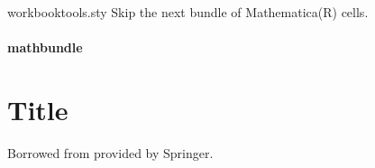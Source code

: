 \documentclass{article}
\begin{document}
\begin{package}{workbooktools.sty}
Skip the next bundle of Mathematica(R) cells.

\begin{source}[\skipMathBundle]
\newcommand\skipMathBundle{\stepcounter{mathbundle}}
\end{source}

\paragraph{mathbundle}

\begin{source}[mathbundle]
\newenvironment{mathbundle}{%
  \begin{list}{}{
    \parskip=6pt plus 4pt
    \topsep=6pt plus 4pt
    \partopsep=0pt plus 4pt
    \itemsep=6pt plus 4pt
    \parsep=0pt plus 4pt
  }%
  \raggedleft}{%
  \end{list}}
\end{source}

\begin{source}[\includemathcell]
\newcommand\includemathcell[1]{%
  \item\relax\texttt{[image: \#1]}}
\end{source}

\begin{source}[\mathcellscale]
\newcommand\mathcellscale{0.72}
\end{source}

\section{Title}

Borrowed from  provided by Springer.

\begin{source}[\maketitle]
\def\maketitle{\par
 \begingroup
   \def\thefootnote{\fnsymbol{footnote}}%
   \def\@makefnmark{\hbox
       to\z@{$\m@th^{\@thefnmark}$\hss}}%
   \if@twocolumn
     \twocolumn[\@maketitle]%
     \else \newpage
     \global\@topnum\z@   %
     \@maketitle \fi\thispagestyle{empty}\@thanks
     \par\penalty -\@M
 \endgroup
 \setcounter{footnote}{0}%
 \let\maketitle\relax
 \let\@maketitle\relax
 \gdef\@thanks{}\gdef\@author{}\gdef\@title{}\let\thanks\relax}
\end{source}


\end{package}
\end{document}
